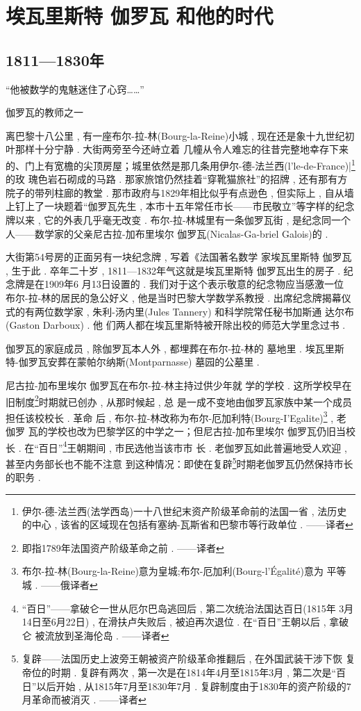 \chapter{埃瓦里斯特 \textbullet 伽罗瓦 和他的时代}



\section{1811—1830年}
\begin{flushright}
	“他被数学的鬼魅迷住了心窍……”
	
	伽罗瓦的教师之一
\end{flushright}

离巴黎十八公里 , 有一座布尔-拉-林(Bourg-la-Reine)小城 ,  现在还是象十九世纪初叶那样十分宁静 . 大街两旁至今还峙立着 几幢从令人难忘的往昔完整地幸存下来的、门上有宽檐的尖顶房屋；城里依然是那几条用伊尔-德-法兰西(l'le-de-France)|\footnote{伊尔-德-法兰西(法学西岛)一十八世纪末资产阶级革命前的法国一省 , 法历史的中心 , 该省的区域现在包括有塞纳-瓦斯省和巴黎市等行政单位 . ——译者}的玫 瑰色岩石砌成的马路 . 那家旅馆仍然挂着“穿靴猫旅社”的招牌 ,  还有那有方院子的带列柱廊的教堂 . 那市政府与1829年相比似乎有点逊色 , 但实际上 , 自从墙上钉上了一块题着“伽罗瓦先生 , 本市十五年常任市长——市民敬立”等字样的纪念牌以来 , 它的外表几乎毫无改变 . 布尔-拉-林城里有一条伽罗瓦街 , 是纪念同一个人——数学家的父亲尼古拉-加布里埃尔 \textbullet 伽罗瓦(Nicalas-Ga-briel Galois)的 . 

大街第54号房的正面另有一块纪念牌 , 写着《法国著名数学 家埃瓦里斯特 \textbullet 伽罗瓦 , 生于此 . 卒年二十岁 , 1811—1832年气这就是埃瓦里斯特 \textbullet 伽罗瓦出生的房子 . 纪念牌是在1909年6 月13日设置的 . 我们对于这个表示敬意的纪念物应当感激一位 布尔-拉-林的居民的急公好义 , 他是当时巴黎大学数学系教授 . 出席纪念牌揭幕仪式的有两位数学家 , 朱利-汤内里(Jules Tannery) 和科学院常任秘书加斯通 \textbullet 达尔布(Gaston Darboux) . 他 们两人都在埃瓦里斯特被开除出校的师范大学里念过书 . 

伽罗瓦的家庭成员 , 除伽罗瓦本人外 , 都埋葬在布尔-拉-林的 墓地里 . 埃瓦里斯特-伽罗瓦安葬在蒙帕尔纳斯(Montparnasse) 墓园的公墓里 . 

尼古拉-加布里埃尔 \textbullet 伽罗瓦在布尔-拉-林主持过供少年就 学的学校 . 这所学校早在旧制度\footnote{即指1789年法国资产阶级革命之前 . ——译者}时期就已创办 , 从那时候起 , 总 是一成不变地由伽罗瓦家族中某一个成员担任该校校长 . 革命 后 , 布尔-拉-林改称为布尔-厄加利特(Bourg-I'Egalite)\footnote{布尔-拉-林(Bourg-la-Reine)意为皇城;布尔-厄加利(Bourg-l'Égalité)意为 平等城 . ——俄译者} , 老伽罗 瓦的学校也改为巴黎学区的中学之一；但尼古拉-加布里埃尔 \textbullet 伽罗瓦仍旧当校长 . 在“百日”\footnote{“百日”——拿破仑一世从厄尔巴岛逃回后 , 第二次统治法国达百日(1815年 3月14日至6月22日) , 在滑扶卢失败后 , 被迫再次退位 . 在“百日”王朝以后 , 拿破仑 被流放到圣海伦岛 . ——译者}王朝期间 , 市民选他当该市市 长 . 老伽罗瓦如此普遍地受人欢迎 , 甚至内务部长也不能不注意 到这种情况：即使在复辟\footnote{复辟——法国历史上波旁王朝被资产阶级革命推翻后 , 在外国武装干涉下恢 复帝位的时期 . 复辟有两次 , 第一次是在1814年4月至1815年3月 , 第二次是“百 日”以后开始 , 从1815年7月至1830年7月 . 复辟制度由于1830年的资产阶级的7 月革命而被消灭 . ——译者}时期老伽罗瓦仍然保持市长的职务 . 

